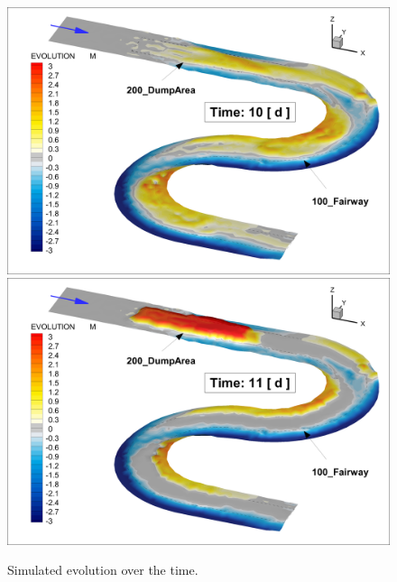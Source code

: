 \begin{figure} [!h]
\centering
\includegraphics[scale=0.14]{img/critDig_Poly_10p0d.png}
\includegraphics[scale=0.14]{img/critDig_Poly_11p0d.png}
\caption{Simulated evolution over the time.}\label{result56}
\end{figure}

